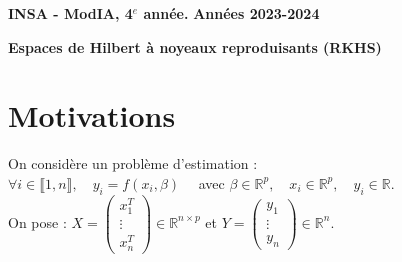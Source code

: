 \documentclass[12pt,a4paper]{article}
\newcommand{\entete}{
    \noindent\textbf{INSA - ModIA, 4$^e$ année.}
    \hfill \textbf{Années 2023-2024}
    
    \begin{center}
        \textbf{\LARGE Espaces de Hilbert à noyeaux reproduisants (RKHS)}
    \end{center}
}
\begin{document}
\entete

\vspace{0.5cm}

\section{Motivations}

On considère un problème d'estimation : \\
$\forall i \in \llbracket 1, n \rrbracket, \quad y_i = f(x_i, \beta) \quad$ avec $\beta \in \mathbb{R}^p, \quad x_i \in \mathbb{R}^p, \quad y_i \in \mathbb{R}$. \\

On pose : $X = \begin{pmatrix}
    x_1^T \\
    \vdots \\
    x_n^T
\end{pmatrix} \in \mathbb{R}^{n \times p}$ et $Y = \begin{pmatrix}
    y_1 \\
    \vdots \\
    y_n
\end{pmatrix} \in \mathbb{R}^n$. \\
\end{document}
